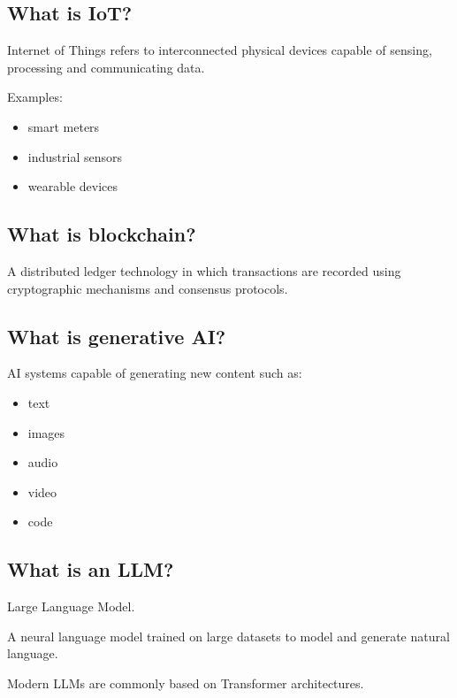 \medskip

\subsection{What is IoT?}

Internet of Things refers to interconnected physical devices capable of sensing, processing and communicating data.

Examples:

\begin{itemize}
  \item smart meters
  \item industrial sensors
  \item wearable devices
\end{itemize}

\medskip

\subsection{What is blockchain?}

A distributed ledger technology in which transactions are recorded using cryptographic mechanisms and consensus protocols.

\medskip

\subsection{What is generative AI?}

AI systems capable of generating new content such as:

\begin{itemize}
  \item text
  \item images
  \item audio
  \item video
  \item code
\end{itemize}

\medskip

\subsection{What is an LLM?}

Large Language Model.

A neural language model trained on large datasets to model and generate natural language.

Modern LLMs are commonly based on Transformer architectures.

